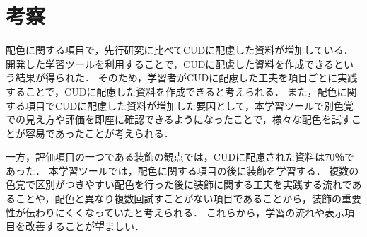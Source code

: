 \section{考察}
配色に関する項目で，先行研究に比べてCUDに配慮した資料が増加している．
開発した学習ツールを利用することで，CUDに配慮した資料を作成できるという結果が得られた．
そのため，学習者がCUDに配慮した工夫を項目ごとに実践することで，CUDに配慮した資料を作成できると考えられる．
また，配色に関する項目でCUDに配慮した資料が増加した要因として，本学習ツールで別色覚での見え方や評価を即座に確認できるようになったことで，様々な配色を試すことが容易であったことが考えられる．

一方，評価項目の一つである装飾の観点では，CUDに配慮された資料は70％であった．
本学習ツールでは，配色に関する項目の後に装飾を学習する．
複数の色覚で区別がつきやすい配色を行った後に装飾に関する工夫を実践する流れであることや，配色と異なり複数回試すことがない項目であることから，装飾の重要性が伝わりにくくなっていたと考えられる．
これらから，学習の流れや表示項目を改善することが望ましい．